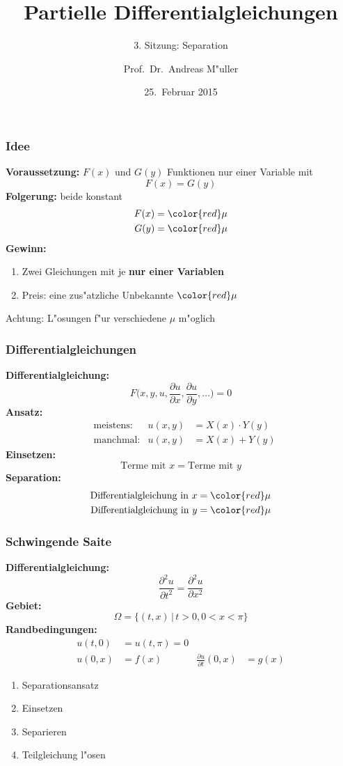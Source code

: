 \documentclass{beamer}
\title[]{Partielle Differentialgleichungen}
\subtitle{3. Sitzung: Separation}
\date[25.~Februar 2015]{25.~Februar 2015}
\author{Prof.~Dr.~Andreas M"uller}
\begin{document}
\begin{frame}
\titlepage
\end{frame}

\begin{frame}
\frametitle{Idee}
{\bf Voraussetzung:}
$F(x)$ und $G(y)$ Funktionen nur einer Variable mit
\[
F(x)=G(y)
\]
\pause
{\bf Folgerung:} beide konstant
\begin{align*}
F(x)&=\color{red}\mu\\
G(y)&=\color{red}\mu
\end{align*}
\pause
{\bf Gewinn:}
\begin{enumerate}
\item Zwei Gleichungen mit je {\bf nur einer Variablen}
\item Preis: eine zus"atzliche Unbekannte $\color{red}\mu$
\end{enumerate}
\pause
Achtung: L"osungen f"ur verschiedene $\mu$ m"oglich
\end{frame}

\begin{frame}
\frametitle{Differentialgleichungen}
{\bf Differentialgleichung:}
\[
F\biggl(x, y, u,
\frac{\partial u}{\partial x},
\frac{\partial u}{\partial y},\dots\biggr)=0
\]
\pause
{\bf Ansatz:}
\begin{align*}
&\text{meistens:}&
u(x,y)&=X(x)\cdot Y(y)\\
&\text{manchmal:}&
u(x,y)&=X(x) + Y(y)
\end{align*}
\pause
{\bf Einsetzen:}
\[
\text{Terme mit $x$} = \text{Terme mit $y$}
\]
\pause
{\bf Separation:}
\begin{align*}
\text{Differentialgleichung in $x$}&= \color{red}\mu\\
\text{Differentialgleichung in $y$}&= \color{red}\mu
\end{align*}
\end{frame}

\begin{frame}
\frametitle{Schwingende Saite}
{\bf Differentialgleichung:}
\[
\frac{\partial^2 u}{\partial t^2}
=
\frac{\partial^2 u}{\partial x^2}
\]
{\bf Gebiet:}
\[
\Omega = \{ (t,x) \,|\, t>0, 0<x<\pi\}
\]
{\bf Randbedingungen:}
\begin{align*}
u(t,0)&=u(t,\pi)=0\\
u(0,x)&=f(x)&\frac{\partial u}{\partial t}(0,x)&=g(x)
\end{align*}
\begin{enumerate}
\pause
\item Separationsansatz
\item Einsetzen
\item Separieren
\item Teilgleichung l"osen
\end{enumerate}
\end{frame}
\end{document}
